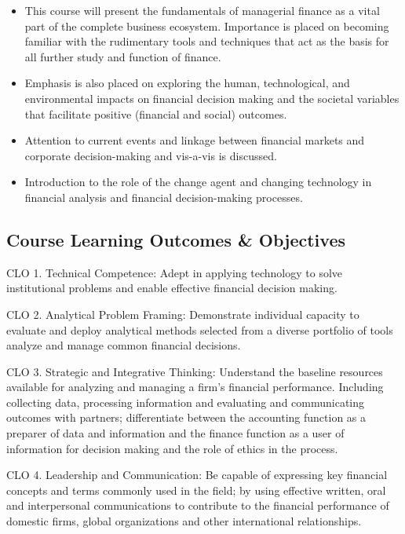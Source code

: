 \documentclass[11pt]{article}
\begin{document}
\begin{itemize}
\item This course will present the fundamentals of managerial finance as a vital part of the complete business ecosystem. Importance is placed on becoming familiar with the rudimentary tools and techniques that act as the basis for all further study and function of finance.

\item Emphasis is also placed on exploring the human, technological, and environmental impacts on financial decision making and the societal variables that facilitate positive (financial and social) outcomes.

\item Attention to current events and linkage between financial markets and corporate decision-making and vis-a-vis is discussed.

\item Introduction to the role of the change agent and changing technology in financial analysis and financial decision-making processes.
\end{itemize}

\subsection{Course Learning Outcomes \& Objectives}
\label{sec:orge0ce7f2}

CLO 1. Technical Competence: Adept in applying technology to solve institutional problems and enable effective financial decision making.

CLO 2. Analytical Problem Framing: Demonstrate individual capacity to evaluate and deploy analytical methods selected from a diverse portfolio of tools analyze and manage common financial decisions.

CLO 3. Strategic and Integrative Thinking: Understand the baseline resources available for analyzing and managing a firm’s financial performance. Including collecting data, processing information and evaluating and communicating outcomes with partners; differentiate between the accounting function as a preparer of data and information and the finance function as a user of information for decision making and the role of ethics in the process.

CLO 4. Leadership and Communication: Be capable of expressing key financial concepts and terms commonly used in the field; by using effective written, oral and interpersonal communications to contribute to the financial performance of domestic firms, global organizations and other international relationships.
\end{document}
